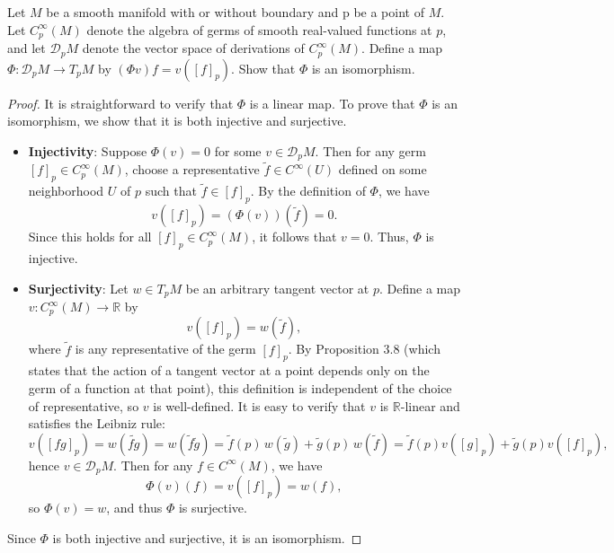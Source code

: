 \begin{problem}
    Let $M$ be a smooth manifold with or without boundary and p be a point of $M$. Let $C_p^\infty(M)$ denote the algebra of germs of smooth real-valued functions at $p$, and let $\mathcal{D}_pM$ denote the vector space of derivations of $C_p^\infty(M)$. Define a map $\Phi \colon \mathcal{D}_pM \to T_pM$ by $(\Phi v)f = v([f]_p)$. Show that $\Phi$ is an isomorphism.
    \begin{proof}
        It is straightforward to verify that $\Phi$ is a linear map. To prove that $\Phi$ is an isomorphism, we show that it is both injective and surjective.

        \begin{itemize}
            \item \textbf{Injectivity}: Suppose $\Phi(v) = 0$ for some $v \in \mathcal{D}_pM$. Then for any germ $[f]_p \in C_p^\infty(M)$, choose a representative $\tilde{f} \in C^\infty(U)$ defined on some neighborhood $U$ of $p$ such that $\tilde{f} \in [f]_p$. By the definition of $\Phi$, we have
            $$
            v([f]_p) = (\Phi(v))(\tilde{f}) = 0.
            $$
            Since this holds for all $[f]_p \in C_p^\infty(M)$, it follows that $v = 0$. Thus, $\Phi$ is injective.
            \item \textbf{Surjectivity}: Let $w \in T_pM$ be an arbitrary tangent vector at $p$. Define a map $v: C_p^\infty(M) \to \mathbb{R}$ by
            $$
            v([f]_p) = w(\tilde{f}),
            $$
            where $\tilde{f}$ is any representative of the germ $[f]_p$. By Proposition 3.8 (which states that the action of a tangent vector at a point depends only on the germ of a function at that point), this definition is independent of the choice of representative, so $v$ is well-defined. It is easy to verify that $v$ is $\mathbb{R}$-linear and satisfies the Leibniz rule:
            $$
            v([fg]_p) = w(\widetilde{fg}) = w(\tilde{f}\tilde{g}) = \tilde{f}(p)\,w(\tilde{g}) + \tilde{g}(p)\,w(\tilde{f}) = \tilde{f}(p) v([g]_p) + \tilde{g}(p)v([f]_p),
            $$
            hence $v \in \mathcal{D}_pM$. Then for any $f \in C^\infty(M)$, we have
            $$
            \Phi(v)(f) = v([f]_p) = w(f),
            $$
            so $\Phi(v) = w$, and thus $\Phi$ is surjective.
        \end{itemize}
        Since $\Phi$ is both injective and surjective, it is an isomorphism.
    \end{proof}
\end{problem}

